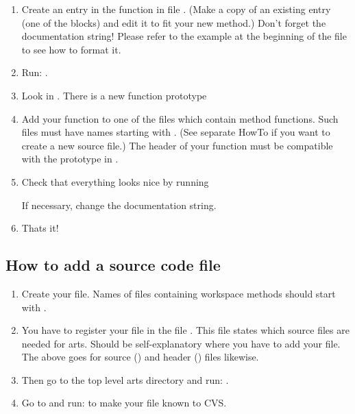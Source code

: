 \begin{enumerate}
\item Create an entry in the function  in file
  .  (Make a copy of an existing entry (one of the
   blocks) and edit it to fit your new
  method.) Don't forget the documentation string! Please refer to the
  example at the beginning of the file to see how to format it.
\item Run:
  .
\item Look in . There is a new function prototype
  \begin{quote}
  \end{quote}
\item Add your function to one of the  files which contain method
  functions. Such files must have names starting with . (See
  separate HowTo if you want to create a new source file.) The header
  of your function must be compatible with the prototype in .
\item Check that everything looks nice by running 
  \begin{quote}
  \end{quote}
  If necessary, change the documentation string.

\item Thats it!
\end{enumerate}


\subsection{How to add a source code file}
\begin{enumerate}
\item Create your file. Names of files containing workspace methods should
  start with .
\item You have to register your file in the file .
  This file states which source files are needed for arts. Should be
  self-explanatory where you have to add your file. The above goes for
  source () and header () files likewise.
\item Then go to the top level arts directory and run: .
\item Go to  and run:  to make your
  file known to CVS.
\end{enumerate}


